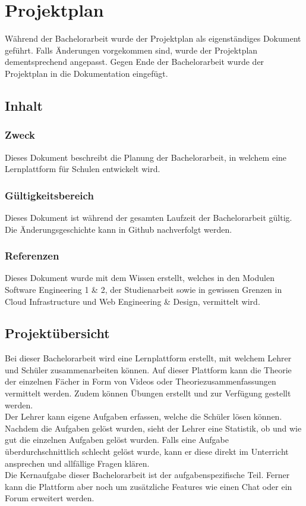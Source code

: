\section{Projektplan}
Während der Bachelorarbeit wurde der Projektplan als eigenständiges Dokument geführt. Falls Änderungen vorgekommen sind, wurde der Projektplan dementsprechend angepasst. Gegen Ende der Bachelorarbeit wurde der Projektplan in die Dokumentation eingefügt.

\subsection{Inhalt}
\subsubsection*{Zweck}
Dieses Dokument beschreibt die Planung der Bachelorarbeit, in welchem eine Lernplattform für Schulen entwickelt wird.

\subsubsection*{Gültigkeitsbereich}
Dieses Dokument ist während der gesamten Laufzeit der Bachelorarbeit gültig. Die Änderungsgeschichte kann in Github nachverfolgt werden.

\subsubsection*{Referenzen}
Dieses Dokument wurde mit dem Wissen erstellt, welches in den Modulen Software Engineering 1 \& 2, der Studienarbeit sowie in gewissen Grenzen in Cloud Infrastructure und Web Engineering \& Design, vermittelt wird.



\subsection{Projektübersicht}
Bei dieser Bachelorarbeit wird eine Lernplattform erstellt, mit welchem Lehrer und Schüler zusammenarbeiten können. Auf dieser Plattform kann die Theorie der einzelnen Fächer in Form von Videos oder Theoriezusammenfassungen vermittelt werden. Zudem können Übungen erstellt und zur Verfügung gestellt werden. \\
Der Lehrer kann eigene Aufgaben erfassen, welche die Schüler lösen können. Nachdem die Aufgaben gelöst wurden, sieht der Lehrer eine Statistik, ob und wie gut die einzelnen Aufgaben gelöst wurden. Falls eine Aufgabe überdurchschnittlich schlecht gelöst wurde, kann er diese direkt im Unterricht ansprechen und allfällige Fragen klären. \\
Die Kernaufgabe dieser Bachelorarbeit ist der aufgabenspezifische Teil. Ferner kann die Plattform aber noch um zusätzliche Features wie einen Chat oder ein Forum erweitert werden.


